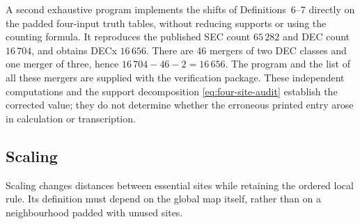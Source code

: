 \documentclass[11pt,a4paper]{article}
\newenvironment{revision}{\color{blue}}{}
\newenvironment{revision}{\color{black}}{}
\begin{document}
\begin{revision}
A second exhaustive program implements the shifts of Definitions~6--7
directly on the padded four-input truth tables, without reducing supports
or using the counting formula. It reproduces the published SEC count
$65\,282$ and DEC count $16\,704$, and obtains DECx $16\,656$.
There are 46 mergers of two DEC classes and one merger of three, hence
$16\,704-46-2=16\,656$.
The program and the list of all these mergers are supplied with the
verification package. These independent computations and the support
decomposition \eqref{eq:four-site-audit} establish the corrected value;
they do not determine whether the erroneous printed entry arose in
calculation or transcription.
\end{revision}


\begin{revision}
\subsection{Scaling}
\label{sec:scaling}
Scaling changes distances between essential sites while retaining the
ordered local rule. Its definition must depend on the global map itself,
rather than on a neighbourhood padded with unused sites.


\end{revision}
\end{document}
